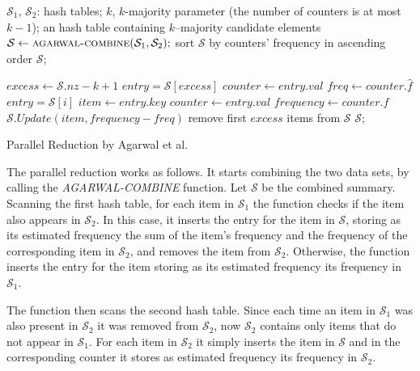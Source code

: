\documentclass[final,3p,times]{elsarticle}
\begin{document}
\begin{algorithm}
\begin{algorithmic}[1]
\Require $\mathcal{S}_1$, $\mathcal{S}_2$: hash tables; $k$, $k$-majority parameter (the number of counters is at most $k-1$);
\Ensure an hash table containing $k$--majority candidate elements
 
\State $\mathcal{S} \leftarrow \Call{agarwal-combine}{\mathcal{S}_1, \mathcal{S}_2};$
\State sort $\mathcal{S}$ by counters' frequency in ascending order
	\State \Return $\mathcal{S}$;
\Else {}

	\State $excess \leftarrow \mathcal{S}.nz - k + 1$
	\State $entry = \mathcal{S}[excess]$
		\State $counter \leftarrow entry.val$	
		\State $freq \leftarrow counter.\hat{f}$
		\State $entry = \mathcal{S}[i]$
		\State $item \leftarrow entry.key$
		\State $counter \leftarrow entry.val$	
		\State $frequency \leftarrow counter.\hat{f}$
		\State $\mathcal{S}.Update(item, frequency - freq)$
	\EndFor
	\State remove first $excess$ items from $\mathcal{S}$
	\State \Return $\mathcal{S}$;
\EndIf
\EndProcedure
\caption{Parallel Reduction by Agarwal et al.}
\label{par}
\end{algorithmic}
\end{algorithm}

The parallel reduction works as follows. It starts combining the two data sets, by calling the \textit{AGARWAL-COMBINE} function. Let $\mathcal{S}$ be the combined summary. Scanning the first hash table, for each item in $\mathcal{S}_1$ the function checks if the item also appears in $\mathcal{S}_2$. In this case, it inserts the entry for the item in $\mathcal{S}$, storing as its estimated frequency the sum of the item's frequency and the frequency of the corresponding item in $\mathcal{S}_2$, and removes the item from $\mathcal{S}_2$. Otherwise, the function inserts the entry for the item storing as its estimated frequency its frequency in $\mathcal{S}_1$. 

The function then scans the second hash table. Since each time an item in $\mathcal{S}_1$ was also present in $\mathcal{S}_2$ it was removed from $\mathcal{S}_2$, now $\mathcal{S}_2$ contains only items that do not appear in $\mathcal{S}_1$. For each item in $\mathcal{S}_2$ it simply inserts the item in $\mathcal{S}$ and in the corresponding counter it stores as estimated frequency its frequency in $\mathcal{S}_2$. 
\end{document}
